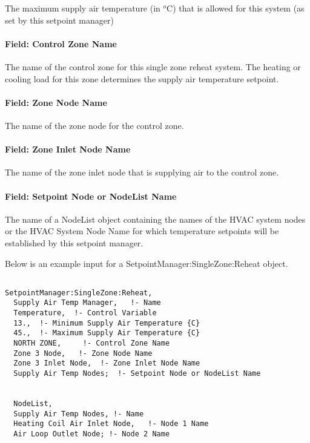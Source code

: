 The maximum supply air temperature (in \(^{o}\)C) that is allowed for this system (as set by this setpoint manager)

\paragraph{Field: Control Zone Name}\label{field-control-zone-name-2016-06-16}

The name of the control zone for this single zone reheat system. The heating or cooling load for this zone determines the supply air temperature setpoint.

\paragraph{Field: Zone Node Name}\label{field-zone-node-name-000}

The name of the zone node for the control zone.

\paragraph{Field: Zone Inlet Node Name}\label{field-zone-inlet-node-name}

The name of the zone inlet node that is supplying air to the control zone.

\paragraph{Field: Setpoint Node or NodeList Name}\label{field-setpoint-node-or-nodelist-name-3}

The name of a NodeList object containing the names of the HVAC system nodes or the HVAC System Node Name for which temperature setpoints will be established by this setpoint manager.

Below is an example input for a SetpointManager:SingleZone:Reheat object.

\begin{lstlisting}

SetpointManager:SingleZone:Reheat,
  Supply Air Temp Manager,   !- Name
  Temperature,  !- Control Variable
  13.,  !- Minimum Supply Air Temperature {C}
  45.,  !- Maximum Supply Air Temperature {C}
  NORTH ZONE,     !- Control Zone Name
  Zone 3 Node,   !- Zone Node Name
  Zone 3 Inlet Node,  !- Zone Inlet Node Name
  Supply Air Temp Nodes;  !- Setpoint Node or NodeList Name


  NodeList,
  Supply Air Temp Nodes, !- Name
  Heating Coil Air Inlet Node,   !- Node 1 Name
  Air Loop Outlet Node; !- Node 2 Name
\end{lstlisting}

